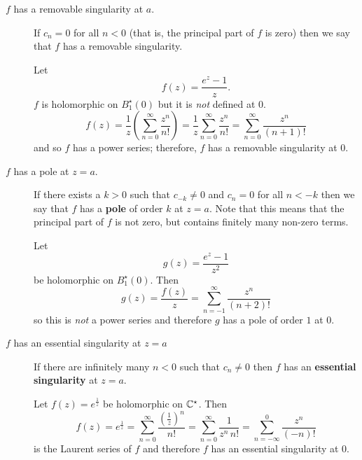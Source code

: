 \begin{description}
    \item[$f$ has a removable singularity at $a$.]
        If $c_n = 0$ for all $n < 0$ 
        (that is, the principal part of $f$ is zero)
        then we say that $f$ has a removable singularity.
        \begin{example}
            Let
            \[
                f(z) = \frac{e^z - 1}{z}.
            \]
            $f$ is holomorphic on $B_1^\star(0)$ but it is \emph{not} defined at $0$.
            \[
                f(z) = \frac1z
                \left(
                    \sum^{\infty}_{n=0} \frac{z^n}{n!}
                \right)
                = \frac1z \sum^{\infty}_{n=0} \frac{z^n}{n!} 
                = \sum^{\infty}_{n=0} \frac{z^n}{(n+1)!} 
            \]
            and so $f$ has a power series;
            therefore, $f$ has a removable singularity at $0$.
        \end{example}

    \item[$f$ has a pole at $z=a$.]
        If there exists a $k>0$ such that $c_{-k} \neq 0$
        and $c_n = 0$ for all $n < -k$
        then we say that $f$ has a \textbf{pole} of order $k$ at $z=a$.
        Note that this means that the principal part of $f$ is not zero,
        but contains finitely many non-zero terms.
        \begin{example}
            Let
            \[
                g(z) = \frac{e^z - 1}{z^2} 
            \]
            be holomorphic on $B_1^\star(0)$.
            Then
            \[
                g(z) = \frac{f(z)}{z} = \sum^{\infty}_{n = -1} \frac{z^n}{(n+2)!}
            \]
            so this is \emph{not} a power series and therefore $g$ has a pole of order $1$
            at $0$.
        \end{example}

    \item[$f$ has an essential singularity at $z = a$]
        If there are infinitely many $n<0$ such that $c_n \neq 0$ then
        $f$ has an \textbf{essential singularity} at $z = a$.
        \begin{example}
            Let $f(z) = e^{\frac1z}$ be holomorphic on $\mathbb{C}^\star$.
            Then
            \[
                f(z) 
                = e^{\frac1z} 
                = \sum^{\infty}_{n=0} \frac{\left(\frac1z\right)^n}{n!}
                = \sum^{\infty}_{n=0} \frac{1}{z^n\,n!} 
                = \sum^{0}_{n=-\infty} \frac{z^n}{(-n)!}  
            \]
            is the Laurent series of $f$ and therefore $f$ has an essential singularity at
            $0$.
        \end{example}
\end{description}

